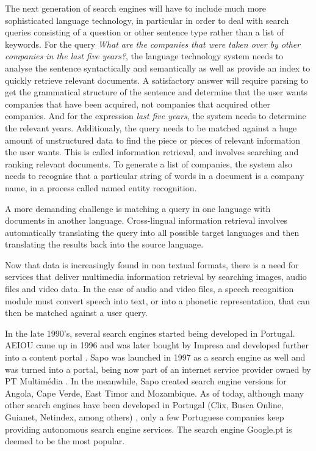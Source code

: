 \begin{multicols}{2}
The next generation of search engines will have to include much more sophisticated language technology, in particular in order to deal with search queries consisting of a question or other sentence type rather than a list of keywords. 
For the query \textit{What are the companies that were taken over by other companies in the last five years?}, 
the language technology system needs to analyse the sentence syntactically and semantically as well as provide an index to quickly retrieve relevant documents. 
A satisfactory answer will require parsing to get the grammatical structure of the sentence and determine 
that the user wants companies that have been acquired, not companies that acquired other companies. 
And for the expression \textit{last five years}, the system needs to determine the relevant years. 
Additionaly, the query needs to be matched against a huge amount of unstructured data to find the piece or pieces of relevant information the user wants. 
This is called information retrieval, and involves searching and ranking relevant documents. 
To generate a list of companies, the system also needs to recognise that a particular string of words in a document is a company name, 
in a process called named entity recognition.


A more demanding challenge is matching a query in one language with documents in another language. 
Cross-lingual information retrieval involves automatically translating the query into all possible target languages 
and then translating the results back into the source language. 

 Now that data is increasingly found in non textual formats, there is a need for services that deliver multimedia 
information retrieval by searching images, audio files and video data. 
In the case of audio and video files, a speech recognition module must convert speech into text,
or into a phonetic representation, that can then be matched against a user query.

In the late 1990's, several search engines started being developed in Portugal. 
AEIOU came up in 1996 and was later bought by Impresa and developed further into a content portal \cite{aeiou}. 
Sapo was launched in 1997 as a search engine as well and was turned into a portal, being now part of an internet service provider owned by PT Multimédia \cite{sapo}. 
In the meanwhile, Sapo created search engine versions for Angola, Cape Verde, East Timor and Mozambique. 
As of today, although many other search engines have been developed in Portugal (Clix, Busca Online, Guianet, Netindex, among others) \cite{colossus}, 
only a few Portuguese companies keep providing autonomous search engine services. The search engine Google.pt is deemed to be the most popular.


\end{multicols}
